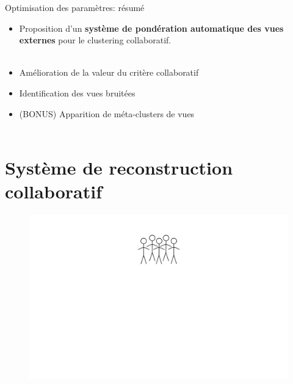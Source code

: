 \documentclass[hyperref={pdfpagelabels=false}]{beamer}
\begin{document}
    \begin{frame}{Optimisation des paramètres: résumé}
        \begin{itemize}
            \item Proposition d'un \textbf{système de pondération automatique 
                des vues externes} pour le clustering collaboratif.\\~\\
            \item Amélioration de la valeur du critère collaboratif
            \item Identification des vues bruitées
            \item (BONUS) Apparition de méta-clusters de vues\\~\\
        \end{itemize}

        \begin{center}
            \fontsize{14pt}{15pt}
        \end{center}
    \end{frame}

    \section{Système de reconstruction collaboratif}
    \begin{frame}
        \begin{figure}[b]
            \centering
            \includegraphics[scale=.26]{idee_reconstruction_collaborative1}
        \end{figure}
    \end{frame}
\end{document}
